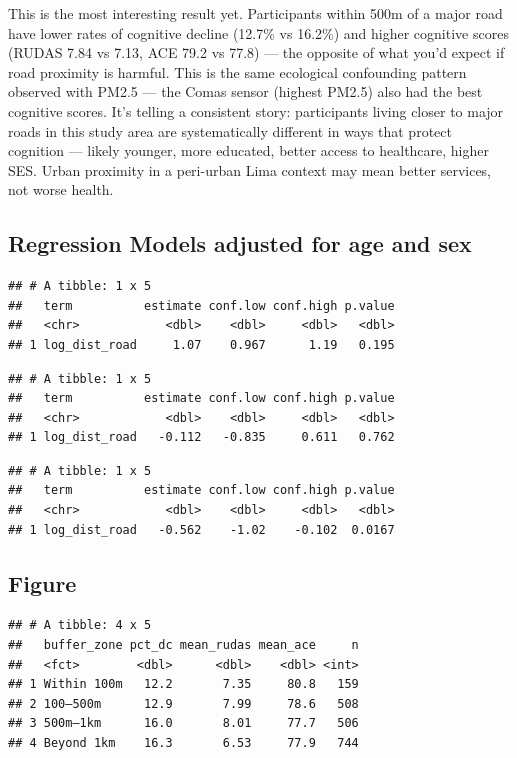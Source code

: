 \documentclass[
  12pt,
]{article}
\begin{document}
This is the most interesting result yet. Participants within 500m of a
major road have lower rates of cognitive decline (12.7\% vs 16.2\%) and
higher cognitive scores (RUDAS 7.84 vs 7.13, ACE 79.2 vs 77.8) --- the
opposite of what you'd expect if road proximity is harmful. This is the
same ecological confounding pattern observed with PM2.5 --- the Comas
sensor (highest PM2.5) also had the best cognitive scores. It's telling
a consistent story: participants living closer to major roads in this
study area are systematically different in ways that protect cognition
--- likely younger, more educated, better access to healthcare, higher
SES. Urban proximity in a peri-urban Lima context may mean better
services, not worse health.

\subsection{Regression Models adjusted for age and
sex}\label{regression-models-adjusted-for-age-and-sex}

\begin{verbatim}
## # A tibble: 1 x 5
##   term          estimate conf.low conf.high p.value
##   <chr>            <dbl>    <dbl>     <dbl>   <dbl>
## 1 log_dist_road     1.07    0.967      1.19   0.195
\end{verbatim}

\begin{verbatim}
## # A tibble: 1 x 5
##   term          estimate conf.low conf.high p.value
##   <chr>            <dbl>    <dbl>     <dbl>   <dbl>
## 1 log_dist_road   -0.112   -0.835     0.611   0.762
\end{verbatim}

\begin{verbatim}
## # A tibble: 1 x 5
##   term          estimate conf.low conf.high p.value
##   <chr>            <dbl>    <dbl>     <dbl>   <dbl>
## 1 log_dist_road   -0.562    -1.02    -0.102  0.0167
\end{verbatim}

\subsection{Figure}\label{figure}

\begin{verbatim}
## # A tibble: 4 x 5
##   buffer_zone pct_dc mean_rudas mean_ace     n
##   <fct>        <dbl>      <dbl>    <dbl> <int>
## 1 Within 100m   12.2       7.35     80.8   159
## 2 100–500m      12.9       7.99     78.6   508
## 3 500m–1km      16.0       8.01     77.7   506
## 4 Beyond 1km    16.3       6.53     77.9   744
\end{verbatim}
\end{document}
